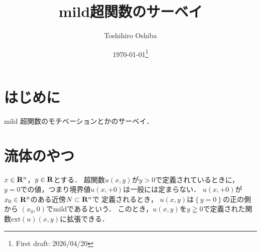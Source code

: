 \newcommand{\cotn}[1][]{\dot{T}^{\ast}{#1}}


\newcommand{\muhom}{\mu hom}
\newcommand{\muHom}[1][]{\mathrm{Hom}^\mu_{\raise1.5ex\hbox to.1em{}#1}}

\newcommand{\mucat}[2][]{\mathsf{D}^{\mathrm{b}}_{#1}(#2)}

\newcommand{\conv}[1][]{\mathbin{\mathop{\circ}\limits_{#1}}}


\newcommand{\lopen}{\mathopen{]}}
\newcommand{\lclosed}{\mathopen{[}}
\newcommand{\ropen}{\mathclose{[}}
\newcommand{\rclosed}{\mathopen{]}}

\DeclarePairedDelimiter{\openintvl}{]}{[}     %
\DeclarePairedDelimiter{\closedintvl}{[}{]}       %
\DeclarePairedDelimiter{\lopenrclosedintvl}{]}{]}    %
\DeclarePairedDelimiter{\lcosedropenintvl}{[}{[}    %


\newcommand{\sm}{\raisebox{2.33pt}{~\rule{6.4pt}{1.3pt}~}}
\newcommand{\smi}{\smallsetminus}

\newcommand{\smid}{\mathrel{;}}



\title{mild超関数のサーベイ}
\author{Toshihiro Oshiba}
\date{\today\footnote{First draft: 2026/04/20}}

\maketitle
\section{はじめに}
mild 超関数のモチベーションとかのサーベイ．

\section{流体のやつ}
\(x\in\mathbf{R}^n\)，\(y\in\mathbf{R}\)とする．
超関数\(u(x,y)\)が\(y>0\)で定義されているときに，
\(y=0\)での値，つまり境界値\(u(x,+0)\)は一般には定まらない．
\(u(x,+0)\)が\(x_0\in\mathbf{R}^n\)のある近傍\(N\subset\mathbf{R}^n\)で
定義されるとき，
\(u(x,y)\)は\(\left\{ y=0 \right\}\)の正の側から
\((x_0,0)\)でmildであるという．
このとき，\(u(x,y)\)を\(y\geqq0\)で定義された関数\(\mathrm{ext}(u)(x,y)\)に拡張できる．

